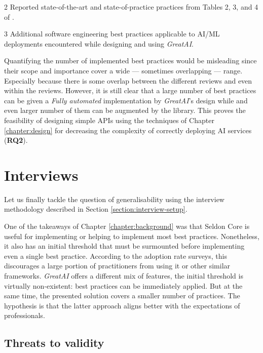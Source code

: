 \begin{table}
\begin{threeparttable}
{\begin{tabular}{p{7cm}@{\hskip 0.5cm}l@{\hskip 0cm}c}
\end{tabular}}
\begin{tablenotes}
    \item[2] Reported state-of-the-art and state-of-practice practices from Tables 2, 3, and 4 of \cite{john2020architecting}.
    \item[3] Additional software engineering best practices applicable to AI/ML deployments encountered while designing and using \textit{GreatAI}.
    \end{tablenotes}
\end{threeparttable}
\end{table}

Quantifying the number of implemented best practices would be misleading since their scope and importance cover a wide --- sometimes overlapping --- range. Especially because there is some overlap between the different reviews and even within the reviews. However, it is still clear that a large number of best practices can be given a \textit{Fully automated} implementation by \textit{GreatAI}'s design while and even larger number of them can be augmented by the library. This proves the feasibility of designing simple APIs using the techniques of Chapter \ref{chapter:design} for decreasing the complexity of correctly deploying AI services (\textbf{RQ2}).

\section{Interviews} \label{section:interviews}

Let us finally tackle the question of generalisability using the interview methodology described in Section \ref{section:interview-setup}.

One of the takeaways of Chapter \ref{chapter:background} was that Seldon Core is useful for implementing or helping to implement most best practices. Nonetheless, it also has an initial threshold that must be surmounted before implementing even a single best practice. According to the adoption rate surveys, this discourages a large portion of practitioners from using it or other similar frameworks. \textit{GreatAI} offers a different mix of features, the initial threshold is virtually non-existent: best practices can be immediately applied. But at the same time, the presented solution covers a smaller number of practices. The hypothesis is that the latter approach aligns better with the expectations of professionals. 

\subsection{Threats to validity}

